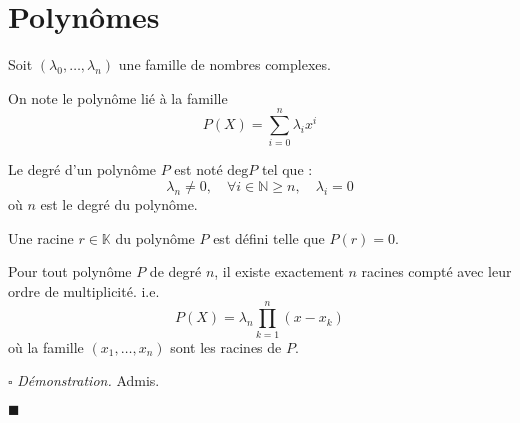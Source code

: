 \documentclass[a4paper, titlepage]{article}
\renewenvironment{proof}{$\square$ \footnotesize\textit{Démonstration.}}{\begin{flushright}$\blacksquare$\end{flushright}}
\begin{document}
	\section{Polynômes}
	\begin{defn}
		Soit $(\lambda_0,\ldots,\lambda_n)$ une famille de nombres complexes.

		On note le polynôme lié à la famille $$P(X)=\sum_{i=0}^{n} \lambda_i x^i$$
	\end{defn}
	\begin{defn}
		Le degré d'un polynôme $P$ est noté $\mathrm{deg}P$ tel que :
		$$ \lambda_n\neq 0,\quad\forall i\in\mathbb{N}\geqslant n,\quad\lambda_i = 0 $$
		où $n$ est le degré du polynôme.
	\end{defn}
	\begin{defn}
		Une racine $r\in\mathbb{K}$ du polynôme $P$ est défini telle que $P(r)=0$.
	\end{defn}
	\begin{thm}
		Pour tout polynôme $P$ de degré $n$, il existe exactement $n$ racines compté avec leur ordre de multiplicité. i.e.
		$$ P(X)=\lambda_n\prod_{k=1}^{n} (x-x_k) $$
		où la famille $(x_1,\ldots,x_n)$ sont les racines de $P$.
	\end{thm}
	\begin{proof}
		Admis.
	\end{proof}
\end{document}
